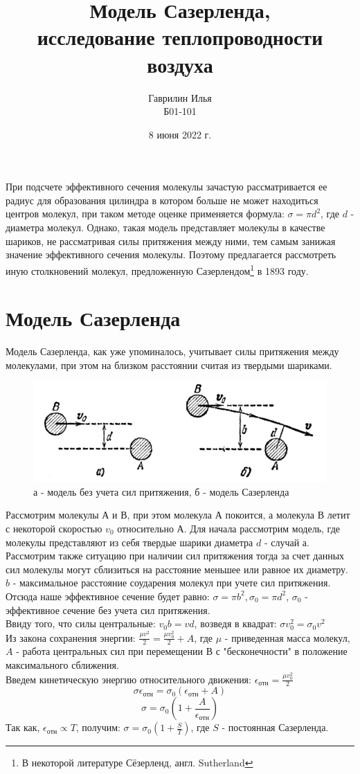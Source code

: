 \documentclass[a4paper, 12pt]{article}%
\date{8 июня 2022 г.}
\author{Гаврилин Илья \\
	Б01-101}
\title{\textbf{Модель Сазерленда,\\исследование теплопроводности воздуха}}
\begin{document}
	\maketitle
	При подсчете эффективного сечения молекулы зачастую рассматривается ее радиус для образования цилиндра в котором больше не может находиться центров молекул, при таком методе оценке применяется формула: $\sigma = \pi d^2$, где $d$ - диаметра молекул.
	Однако, такая модель представляет молекулы в качестве шариков, не рассматривая силы притяжения между ними, тем самым занижая значение эффективного сечения молекулы. Поэтому предлагается рассмотреть иную столкновений молекул, предложенную Сазерлендом\footnote{В некоторой литературе Сёзерленд, англ. Sutherland} в 1893 году. 
	\section{Модель Сазерленда}
	Модель Сазерленда, как уже упоминалось, учитывает силы притяжения между молекулами, при этом на близком расстоянии считая из твердыми шариками.
	\begin{figure}[H]
		\centering
		\includegraphics[width=0.8\linewidth]{model}
		\caption{а - модель без учета сил притяжения, б - модель Сазерленда}
		\label{fig:model}
	\end{figure}
	Рассмотрим молекулы А и В, при этом молекула А покоится, а молекула В летит с некоторой скоростью $v_0$ относительно А. Для начала рассмотрим модель, где молекулы представляют из себя твердые шарики диаметра $d$ - случай а. Рассмотрим также ситуацию при наличии сил притяжения тогда за счет данных сил молекулы могут сблизиться на расстояние меньшее или равное их диаметру. $b$ - максимальное расстояние соударения молекул при учете сил притяжения. Отсюда наше эффективное сечение будет равно: $\sigma = \pi b^2, \sigma_0 = \pi d^2$, $\sigma_0$ - эффективное сечение без учета сил притяжения.\\
	Ввиду того, что силы центральные: $v_0 b = v d$, возведя в квадрат: $\sigma v_{0} ^{2} = \sigma_0 v^{2}$ \\
	Из закона сохранения энергии: $\frac{\mu v^2}{2}=\frac{\mu v_0^2}{2} + A$, где $\mu$ - приведенная масса молекул, $A$ - работа центральных сил при перемещении В с "бесконечности" в положение максимального сближения.\\
	Введем кинетическую энергию относительного движения: $\epsilon_{отн} = \frac{\mu v_0^2}{2}$\\
		$$\sigma \epsilon_{отн} = \sigma_0 (\epsilon_{отн} + A)$$
		$$\sigma  = \sigma_0 (1+ \frac{A}{\epsilon_{отн}})$$
	Так как, $\epsilon_{отн} \propto T$, получим: $\sigma  = \sigma_0 (1+ \frac{S}{T})$, где $S$ - постоянная Сазерленда.
\end{document}
